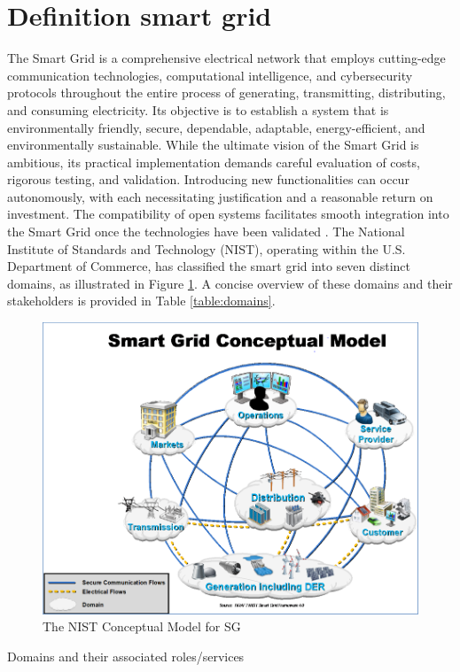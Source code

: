 \section{Definition smart grid}
The Smart Grid is a comprehensive electrical network that employs cutting-edge communication technologies, computational intelligence, and cybersecurity protocols throughout the entire process of generating, transmitting, distributing, and consuming electricity. Its objective is to establish a system that is environmentally friendly, secure, dependable, adaptable, energy-efficient, and environmentally sustainable. While the ultimate vision of the Smart Grid is ambitious, its practical implementation demands careful evaluation of costs, rigorous testing, and validation. Introducing new functionalities can occur autonomously, with each necessitating justification and a reasonable return on investment. The compatibility of open systems facilitates smooth integration into the Smart Grid once the technologies have been validated \cite{gharavi2011smart}.
 The National Institute of Standards and Technology (NIST), operating within the U.S. Department of Commerce, has classified the smart grid into seven distinct domains, as illustrated in Figure \ref{fig:NIST}. A concise overview of these domains and their stakeholders is provided in Table \ref{table:domains}.\cite{gopstein2021nist}
\begin{figure}[h]
	\centering
	\includegraphics[width=\textwidth]{figures/nist.PNG}
	\caption{The NIST Conceptual Model for SG \cite{gopstein2021nist}}
	\label{fig:NIST}
\end{figure}
\begin{table}[h]
    \centering
    
    \caption{Domains and their associated roles/services \cite{gopstein2021nist}}
    \label{table:domains}
\end{table}
